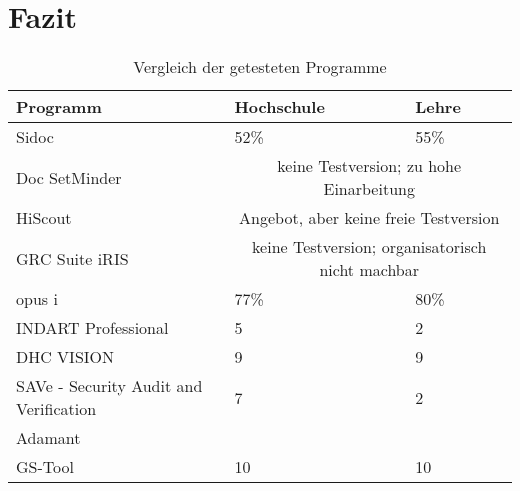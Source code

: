 \section{Fazit}

\begin{table}[h!tb]
	\begin{tabular}{|p{}|p{}|p{}|}
		\hline 
		\textbf{Programm} & \textbf{Hochschule} & \textbf{Lehre}\\ 
		\hline
		Sidoc & 52\% & 55\% \\
		\hline 
		Doc SetMinder & \multicolumn{2}{c|}{keine Testversion; zu hohe Einarbeitung}\\
		\hline 
		HiScout & \multicolumn{2}{c|}{Angebot, aber keine freie Testversion} \\
		\hline 
		GRC Suite iRIS & \multicolumn{2}{c|}{keine Testversion; organisatorisch nicht machbar}\\
		\hline 
		opus i & 77\% & 80\% \\
		\hline
		INDART Professional & 5 & 2 \\
		\hline 
		DHC VISION & 9 & 9 \\
		\hline 
		SAVe - Security Audit and Verification & 7 & 2 \\
		\hline 
		Adamant & & \\
		\hline 
		GS-Tool & 10 & 10\\
		\hline  
		
	\end{tabular} 
	\caption{Vergleich der getesteten Programme}
	\label{tab:programmvergleich}
\end{table}
